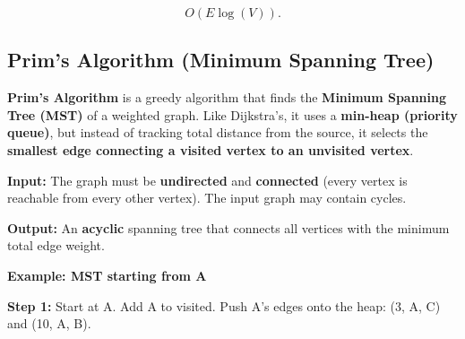 \[
O(E \log (V)).
\]

\subsection{Prim's Algorithm (Minimum Spanning Tree)}

\textbf{Prim's Algorithm} is a greedy algorithm that finds the \textbf{Minimum Spanning Tree (MST)} of a weighted graph. Like Dijkstra's, it uses a \textbf{min-heap (priority queue)}, but instead of tracking total distance from the source, it selects the \textbf{smallest edge connecting a visited vertex to an unvisited vertex}.


\textbf{Input:} The graph must be \textbf{undirected} and \textbf{connected} (every vertex is reachable from every other vertex). The input graph may contain cycles.

\textbf{Output:} An \textbf{acyclic} spanning tree that connects all vertices with the minimum total edge weight.


\textbf{Example: MST starting from A}

\begin{center}
\end{center}

\textbf{Step 1:} Start at A. Add A to visited. Push A's edges onto the heap: (3, A, C) and (10, A, B).

